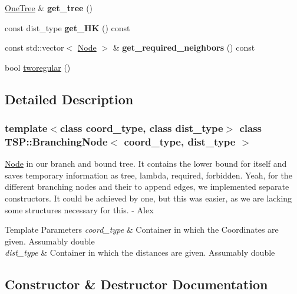 \begin{DoxyCompactItemize}
\hyperlink{classTSP_1_1OneTree}{One\+Tree} \& {\bfseries get\+\_\+tree} ()
\item 
\mbox{\label{classTSP_1_1BranchingNode_a36ee877fe8fa43e2c46246cca4e8e054}} 
const dist\+\_\+type {\bfseries get\+\_\+\+HK} () const
\item 
\mbox{\label{classTSP_1_1BranchingNode_a9398221cb0c4e5dae420f190e2984458}} 
const std\+::vector$<$ \hyperlink{classTSP_1_1Node}{Node} $>$ \& {\bfseries get\+\_\+required\+\_\+neighbors} () const
\item 
bool \hyperlink{classTSP_1_1BranchingNode_a44790ceabe450e8cc5fc718fbd3780da}{tworegular} ()
\end{DoxyCompactItemize}


\subsection{Detailed Description}
\subsubsection*{template$<$class coord\+\_\+type, class dist\+\_\+type$>$\newline
class T\+S\+P\+::\+Branching\+Node$<$ coord\+\_\+type, dist\+\_\+type $>$}

\hyperlink{classTSP_1_1Node}{Node} in our branch and bound tree. It contains the lower bound for itself and saves temporary information as tree, lambda, required, forbidden.  Yeah, for the different branching nodes and their \textquotesingle{}to append\textquotesingle{} edges, we implemented separate constructors. It could be achieved by one, but this was easier, as we are lacking some structures necessary for this. -\/ Alex 
\begin{DoxyTemplParams}{Template Parameters}
{\em coord\+\_\+type} & Container in which the Coordinates are given. Assumably double \\
\hline
{\em dist\+\_\+type} & Container in which the distances are given. Assumably double \\
\hline
\end{DoxyTemplParams}


\subsection{Constructor \& Destructor Documentation}
\mbox{\label{classTSP_1_1BranchingNode_ae008ce73dea24bb2da75887253900473}} 
